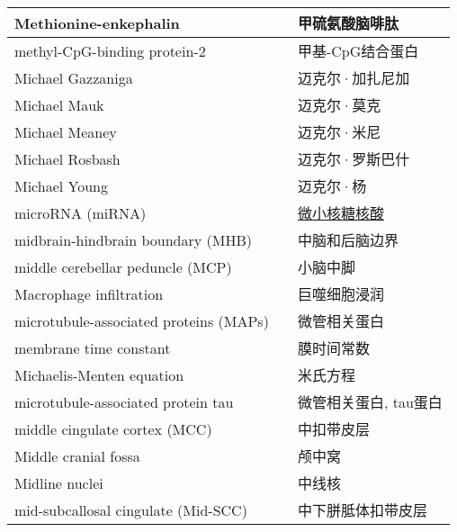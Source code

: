 \begin{longtable}{lll}
	\midrule
	Methionine-enkephalin   && 甲硫氨酸脑啡肽  \\
	
	\midrule
	methyl-CpG-binding protein-2   && 甲基-CpG结合蛋白  \\
	
	\midrule
	Michael Gazzaniga   && 迈克尔·加扎尼加  \\
	
	\midrule
	Michael Mauk   && 迈克尔·莫克  \\
	
	\midrule
	Michael Meaney   && 迈克尔·米尼  \\
	
	\midrule
	Michael Rosbash   && 迈克尔·罗斯巴什  \\
	
	\midrule
	Michael Young   && 迈克尔·杨  \\
	
	\midrule
	microRNA (miRNA)   && \href{https://baike.baidu.com/item/micro\%20RNA/3683223}{微小核糖核酸}  \\
	
	\midrule
	midbrain-hindbrain boundary (MHB) && 中脑和后脑边界  \\
	
	\midrule
	middle cerebellar peduncle (MCP)  && 小脑中脚  \\
	
	\midrule
	Macrophage infiltration   && 巨噬细胞浸润  \\
	
	\midrule
	microtubule-associated proteins (MAPs)  && 微管相关蛋白  \\
	
	\midrule
	membrane time constant   && 膜时间常数  \\
	
	\midrule
	Michaelis-Menten equation   && 米氏方程  \\
	
	\midrule
	microtubule-associated protein tau    && 微管相关蛋白, tau蛋白  \\
	
	\midrule
	middle cingulate cortex (MCC)   && 中扣带皮层  \\
	
	\midrule
	Middle cranial fossa   && 颅中窝  \\
	
	\midrule
	Midline nuclei   && 中线核  \\
	
	\midrule
	mid-subcallosal cingulate (Mid-SCC)  && 中下胼胝体扣带皮层  \\
	

\end{longtable}
